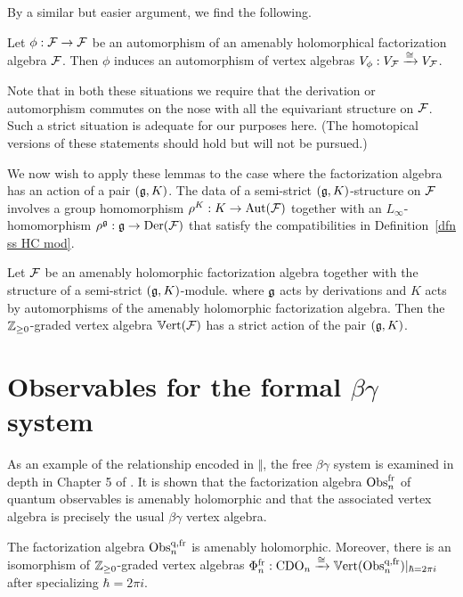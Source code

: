By a similar but easier argument, we find the following.

\begin{lemma}
Let $\phi: \mathcal F \to \mathcal F$ be an automorphism of an amenably holomorphical factorization algebra $\mathcal F$. Then $\phi$ induces an automorphism of vertex algebras $V_\phi: V_\mathcal F \xrightarrow{\cong} V_\mathcal F$.
\end{lemma}

Note that in both these situations we require that the derivation or
automorphism commutes on the nose with all the equivariant structure on $\mathcal F$. 
Such a strict situation is adequate for our purposes here. 
(The homotopical versions of these statements should hold but will not be pursued.)

We now wish to apply these lemmas to the case where the factorization algebra has an action of a pair $(\mathfrak g,K)$. 
The data of a semi-strict $(\mathfrak g,K)$-structure on $\mathcal F$ involves a group homomorphism $\rho^K : K \to {\rm Aut}(\mathcal F)$
together with an $L_\infty$-homomorphism $\rho^\mathfrak g : \mathfrak g \to {\rm Der}(\mathcal F)$
that satisfy the compatibilities in Definition~\ref{dfn ss HC mod}. 

\begin{cor}\label{vertpair} 
Let $\mathcal F$ be an amenably holomorphic factorization algebra 
together with the structure of a semi-strict $(\mathfrak g,K)$-module. where
$\mathfrak g$ acts by derivations and $K$ acts by automorphisms of the amenably holomorphic factorization
algebra. 
Then the $\mathbb Z_{\geq 0}$-graded vertex algebra $\mathbb{V}{\rm ert}(\mathcal F)$ has a
strict action of the pair $(\mathfrak g,K)$. 
\end{cor}

\section{Observables for the formal $\beta\gamma$ system}

As an example of the relationship encoded in $\Vert$,
the free $\beta\gamma$ system is examined in depth in Chapter 5 of \cite{CG1}.
It is shown that the factorization algebra ${\rm Obs}^{{\rm fr}}_n$ of quantum observables is amenably holomorphic
and that the associated vertex algebra is precisely the usual $\beta\gamma$ vertex algebra.

\begin{thm}
The factorization algebra ${\rm Obs}^{{\rm q},{\rm fr}}_n$ is amenably holomorphic. 
Moreover, 
there is an isomorphism of $\mathbb Z_{\geq 0}$-graded vertex algebras 
$\Phi^{{\rm fr}}_n : {\rm CDO}_n \xrightarrow{\cong} \mathbb{V}{\rm ert}({\rm Obs}^{{\rm q},{\rm fr}}_n)|_{\hbar= 2 \pi i}$ after specializing $\hbar=2 \pi i$.
\end{thm}

